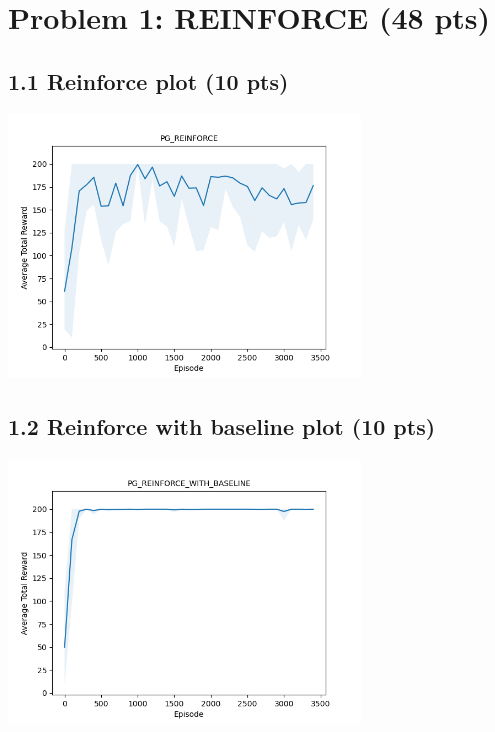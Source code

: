 \documentclass[12pt]{article}
\begin{document}
\newpage
\section*{Problem 1: REINFORCE (48 pts)}

\subsection*{1.1 Reinforce plot (10 pts)}
\begin{solution}[height=9cm]
\begin{center}
    \includegraphics[width=0.7\textwidth,keepaspectratio]{code/pg/graphs/PG_REINFORCE.png}
\end{center}
\end{solution}

\subsection*{1.2 Reinforce with baseline plot (10 pts)}
\begin{solution}[height=9cm]
\begin{center}
    \includegraphics[width=0.7\textwidth,keepaspectratio]{code/pg/graphs/PG_REINFORCE_WITH_BASELINE.png}
\end{center}
\end{solution}
\end{document}
